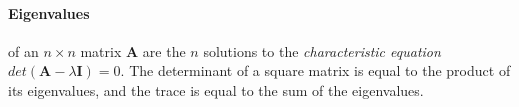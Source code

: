 \documentclass[a4paper,twocolumn]{article}
\begin{document}
\paragraph{Eigenvalues} of an $n \times n$ matrix $\mathbf{A}$ are the $n$
solutions to the \textit{characteristic equation} $det(\mathbf{A} - \lambda
\mathbf{I}) = 0$. The determinant of a square matrix is equal to the product
of its eigenvalues, and the trace is equal to the sum of the eigenvalues.
\end{document}
